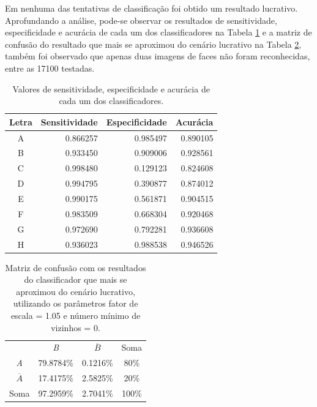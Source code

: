Em nenhuma das tentativas de classificação foi obtido um resultado lucrativo. Aprofundando a análise, pode-se observar os resultados de sensitividade, especificidade e acurácia de cada um dos classificadores na Tabela \ref{tab:results_data} e a matriz de confusão do resultado que mais se aproximou do cenário lucrativo na Tabela \ref{tab:matriz_de_confusao_best_result}, também foi observado que apenas duas imagens de faces não foram reconhecidas, entre as 17100 testadas.

\begin{table}[htbp]
     \caption{Valores de sensitividade, especificidade e acurácia de cada um dos classificadores.}
     \label{tab:results_data}
     \centering
     \begin{tabular}{crrr}
      Letra & Sensitividade & Especificidade & Acurácia \\
      \midrule
           A & 0.866257 & 0.985497 & 0.890105 \\
           B & 0.933450 & 0.909006 & 0.928561 \\
           C & 0.998480 & 0.129123 & 0.824608 \\
           D & 0.994795 & 0.390877 & 0.874012 \\
           E & 0.990175 & 0.561871 & 0.904515 \\
           F & 0.983509 & 0.668304 & 0.920468 \\
           G & 0.972690 & 0.792281 & 0.936608 \\
           H & 0.936023 & 0.988538 & 0.946526 \\
      \end{tabular}
 \end{table}

 \begin{table}[htbp]
     \caption{Matriz de confusão com os resultados do classificador que mais se aproximou do cenário lucrativo, utilizando os parâmetros fator de escala = 1.05 e número mínimo de vizinhos = 0.}
     \label{tab:matriz_de_confusao_best_result}
     \centering
     \begin{tabular}{cccc}\hline\hline
         & \textit{B} & $\overline{B}$ & Soma\\
     \textit{A} & 79.8784\% & 0.1216\% & 80\% \\
     $\overline{A}$ & 17.4175\% & 2.5825\% & 20\% \\
     Soma & 97.2959\% & 2.7041\% & 100\% \\
     \hline\hline
     \end{tabular}
 \end{table}

